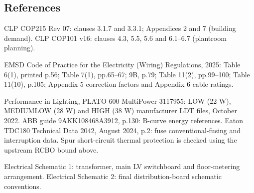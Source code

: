 \subsection*{References}
CLP COP215 Rev 07: clauses 3.1.7 and 3.3.1; Appendices 2 and 7 (building demand). CLP COP101 v16: clauses 4.3, 5.5, 5.6 and 6.1--6.7 (plantroom planning).

EMSD Code of Practice for the Electricity (Wiring) Regulations, 2025: Table 6(1), printed p.56; Table 7(1), pp.65--67; 9B, p.79; Table 11(2), pp.99--100; Table 11(10), p.105; Appendix 5 correction factors and Appendix 6 cable ratings.

Performance in Lighting, PLATO 600 MultiPower 3117955: LOW (22 W), MEDIUMLOW (28 W) and HIGH (38 W) manufacturer LDT files, October 2022. ABB guide 9AKK108468A3912, p.130: B-curve energy references. Eaton TDC180 Technical Data 2042, August 2024, p.2: fuse conventional-fusing and interruption data. Spur short-circuit thermal protection is checked using the upstream RCBO bound above.

\noindent Electrical Schematic 1: transformer, main LV switchboard and floor-metering arrangement. Electrical Schematic 2: final distribution-board schematic conventions.


\clearpage
